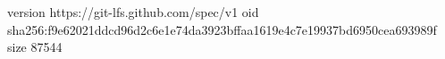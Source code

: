 version https://git-lfs.github.com/spec/v1
oid sha256:f9e62021ddcd96d2c6e1e74da3923bffaa1619e4c7e19937bd6950cea693989f
size 87544
